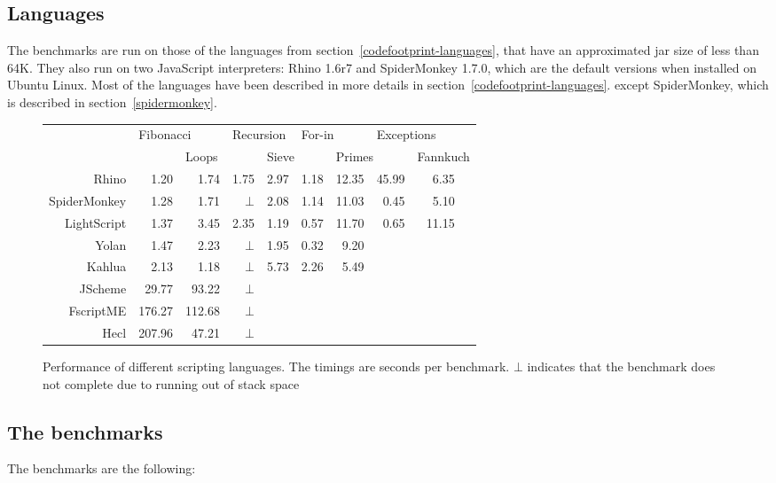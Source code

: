 \subsection{Languages}
The benchmarks are run on those of the languages from section~\ref{codefootprint-languages}, that have an approximated jar size of less than 64K. They also run on two JavaScript interpreters: Rhino 1.6r7 and SpiderMonkey 1.7.0, which are the default versions when installed on Ubuntu Linux.
Most of the languages have been described in more details in section~\ref{codefootprint-languages}.
except SpiderMonkey, which is described in section~\ref{spidermonkey}.

\begin{figure} \begin{center} \begin{tabular}{|r|r|r|r|r|r|r|r|rr|} \hline 
& \multicolumn{2}{|l|}{Fibonacci} & \multicolumn{2}{|l|}{Recursion} & \multicolumn{2}{|l|}{For-in} & \multicolumn{2}{|l}{Exceptions} & \\
& & \multicolumn{2}{|l|}{Loops} & \multicolumn{2}{|l|}{Sieve} & \multicolumn{2}{|l|}{Primes} & \multicolumn{2}{|l|}{Fannkuch} \\
\hline Rhino       & 1.20 & 1.74 & 1.75   & 2.97 & 1.18 & 12.35 & 45.99 & 6.35 & \\ 
\hline SpiderMonkey& 1.28 & 1.71 & $\bot$ & 2.08 & 1.14 & 11.03 & 0.45  & 5.10 & \\ 
\hline LightScript & 1.37 & 3.45 & 2.35   & 1.19 & 0.57 & 11.70 & 0.65  & 11.15 & \\
\hline Yolan       & 1.47 & 2.23 & $\bot$ & 1.95 & 0.32 &  9.20 &  &  & \\
\hline Kahlua      & 2.13 & 1.18 & $\bot$ &  5.73 & 2.26 & 5.49 &  &  & \\ 
\hline JScheme    & 29.77 & 93.22 & $\bot$ & & & & & & \\ 
\hline FscriptME & 176.27 & 112.68& $\bot$ & & & & & & \\ 
\hline Hecl      & 207.96 & 47.21 & $\bot$ & & & & & & \\ 
\hline \end{tabular}
\caption{Performance of different scripting languages. The timings are seconds per benchmark. $\bot$ indicates that the benchmark does not complete due to running out of stack space}
\label{figure-execution-speed}
\end{center} \end{figure}

\subsection{The benchmarks}
The benchmarks are the following:

